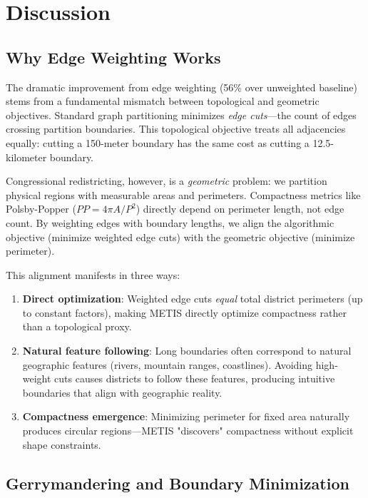 \section{Discussion}

\subsection{Why Edge Weighting Works}

The dramatic improvement from edge weighting (56\% over unweighted baseline) stems from a fundamental mismatch between topological and geometric objectives. Standard graph partitioning minimizes \textit{edge cuts}—the count of edges crossing partition boundaries. This topological objective treats all adjacencies equally: cutting a 150-meter boundary has the same cost as cutting a 12.5-kilometer boundary.

Congressional redistricting, however, is a \textit{geometric} problem: we partition physical regions with measurable areas and perimeters. Compactness metrics like Polsby-Popper ($PP = 4\pi A / P^2$) directly depend on perimeter length, not edge count. By weighting edges with boundary lengths, we align the algorithmic objective (minimize weighted edge cuts) with the geometric objective (minimize perimeter).

This alignment manifests in three ways:

\begin{enumerate}
    \item \textbf{Direct optimization}: Weighted edge cuts \textit{equal} total district perimeters (up to constant factors), making METIS directly optimize compactness rather than a topological proxy.

    \item \textbf{Natural feature following}: Long boundaries often correspond to natural geographic features (rivers, mountain ranges, coastlines). Avoiding high-weight cuts causes districts to follow these features, producing intuitive boundaries that align with geographic reality.

    \item \textbf{Compactness emergence}: Minimizing perimeter for fixed area naturally produces circular regions—METIS "discovers" compactness without explicit shape constraints.
\end{enumerate}

\subsection{Gerrymandering and Boundary Minimization}

